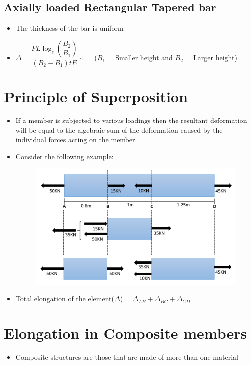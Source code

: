\documentclass[8pt]{report}
\begin{document}
		\subsection{Axially loaded Rectangular Tapered bar}
			\begin{itemize}
				\item The thickness of the bar is uniform
				\item $\boxed{\Delta = \dfrac{PL\log_e\left(\dfrac{B_2}{B_1}\right)}{(B_2-B_1)tE}} \impliedby$ ($B_1$ = Smaller height and $B_2$ = Larger height)
			\end{itemize}\hrulefill
	\section{Principle of Superposition}
		\begin{itemize}
			\item If a member is subjected to various loadings then the resultant deformation will be equal to the algebraic sum of the deformation caused by the individual forces acting on the member.
			\item Consider the following example:
			\begin{figure}[H]
				\centering
				\includegraphics[scale=0.5]{superposition.png}
			\end{figure}
			\item Total elongation of the element($\Delta$) = $\Delta_{AB}+\Delta_{BC}+\Delta_{CD}$
		\end{itemize}\hrulefill
	\section{Elongation in Composite members}
		\begin{itemize}
			\item Composite structures are those that are made of more than one material
		\end{itemize}
\end{document}
